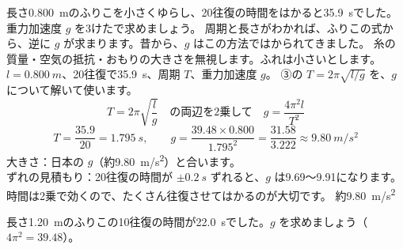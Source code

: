 \label{ph:波-1:ex2}
\begin{phreidai}[ふりこで重力加速度をはかる]
長さ\qty{0.800}{m}のふりこを小さくゆらし、20往復の時間をはかると\qty{35.9}{s}でした。重力加速度 $g$ を3けたで求めましょう。
\phbamen
周期と長さがわかれば、ふりこの式から、逆に $g$ が求まります。昔から、$g$ はこの方法ではかられてきました。
\phmushi
糸の質量・空気の抵抗・おもりの大きさを無視します。ふれは小さいとします。
\phzu
$l=\qty{0.800}{m}$、20往復で\qty{35.9}{s}、周期 $T$、重力加速度 $g$。
\phriyu
③の $T=2\pi\sqrt{l/g}$ を、$g$ について解いて使います。
\phtateru
\[T=2\pi\sqrt{\frac{l}{g}}\quad\text{の両辺を2乗して}\quad g=\frac{4\pi^2l}{T^2}\]
\phtoku
\[T=\frac{35.9}{20}=\qty{1.795}{s},\qquad g=\frac{39.48\times0.800}{1.795^2}=\frac{31.58}{3.222}\approx\qty{9.80}{m/s^2}\]
\phtashikame
大きさ：日本の $g$（約\qty{9.80}{m/s^2}）と合います。\\
ずれの見積もり：20往復の時間が $\pm\qty{0.2}{s}$ ずれると、$g$ は9.69〜9.91になります。時間は2乗で効くので、たくさん往復させてはかるのが大切です。
\kotae 約\qty{9.80}{m/s^2}
\end{phreidai}
\begin{jibun}
長さ\qty{1.20}{m}のふりこの10往復の時間が\qty{22.0}{s}でした。$g$ を求めましょう（$4\pi^2=39.48$）。
\end{jibun}

